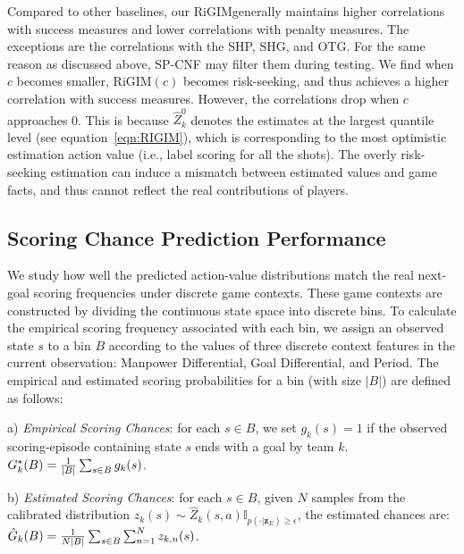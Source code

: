 \documentclass[letterpaper]{article} %
\newcommand{\condition}{\boldsymbol{z}_{E}}
\newcommand{\state}{s}
\newcommand{\action}{a}
\newcommand{\agentIndex}{k}
\newcommand{\confidence}{c}
\newcommand{\sys}{RiGIM}
\newcommand{\bin}{B}
\newcommand{\goal}{g}
\newcommand{\system}{\sys\;}
\begin{document}
Compared to other baselines, our \system generally maintains higher correlations with success measures and lower correlations with penalty measures. The exceptions are the correlations with the SHP, SHG, and OTG. For the same reason as discussed above, SP-CNF may filter them during testing. 
We find when $\confidence$ becomes smaller, \sys$(\confidence)$ becomes risk-seeking, and thus achieves a higher correlation with success measures. However, the correlations drop when $\confidence$ approaches 0.
This is because $\hat{Z}_{\agentIndex}^{0}$ denotes the estimates at the largest quantile level (see equation~\ref{eqn:RIGIM}), which is corresponding to the most optimistic estimation action value (i.e., label scoring for all the shots). The overly risk-seeking estimation can induce a mismatch between estimated values and game facts, and thus cannot reflect the real contributions of players.

\subsection{Scoring Chance Prediction Performance}

We study how well the predicted action-value distributions match the real next-goal scoring frequencies under discrete game contexts. 
These game contexts are constructed by dividing the continuous state space into discrete bins. To calculate the empirical scoring frequency associated with each bin, we assign an observed state $\state$ to a bin $\bin$ according to the values of three discrete context features in the current observation: Manpower Differential, Goal Differential, and Period. The empirical and estimated scoring probabilities for a bin (with size $|\bin|$) are defined as follows:

\noindent a){ \it Empirical Scoring Chances}: for each $\state\in\bin$, we set $\goal_{\agentIndex}{(\state)} = 1$ if the observed scoring-episode containing state $\state$ ends with a goal by team $\agentIndex$. $\MakeUppercase{\goal}^{*}_{\agentIndex}(\bin) = \frac{1}{|\bin|}\sum_{\state \in \bin} \goal_{\agentIndex}(\state)$.

\noindent b){ \it Estimated Scoring Chances}: for each $\state\in\bin$, given $N$ samples from the calibrated distribution $z_{\agentIndex}(\state)\sim\hat{Z}_{\agentIndex}(\state,\action)\mathbb{I}_{p(\cdot|\condition)\geq\epsilon}$, the estimated chances are: $\hat{\MakeUppercase{\goal}}_{\agentIndex}(\bin) = \frac{1}{N|\bin|}\sum_{\state \in \bin} \sum_{n=1}^{N}z_{\agentIndex,n}(\state)$.
\end{document}
